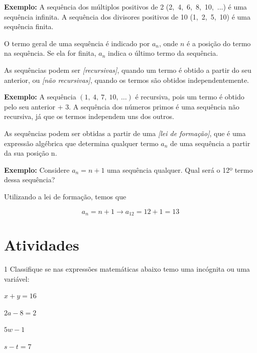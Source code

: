 \textbf{Exemplo:} A sequência dos múltiplos positivos de 2
(2,\ 4,\ 6,\ 8,\ 10,\ ...) é uma sequência infinita. A sequência dos
divisores positivos de 10 (1,\ 2,\ 5,\ 10) é uma sequência finita.

O termo geral de uma sequência é indicado por $a_{n}$, onde $n$  é
a posição do termo na sequência. Se ela for finita, $a_{n}$ indica o
último termo da sequência.

As sequências podem ser \emph{{[}recursivas{]}}, quando um termo é
obtido a partir do seu anterior, ou \emph{{[}não recursivas{]}}, quando
os termos são obtidos independentemente.

\textbf{Exemplo:} A sequência $(1,\ 4,\ 7,\ 10,\ \ldots{})$ é recursiva,
pois um termo é obtido pelo seu anterior + 3. A sequência dos números
primos é uma sequência não recursiva, já que os termos independem uns
dos outros.

As sequências podem ser obtidas a partir de uma \emph{{[}lei de
formação{]}}, que é uma expressão algébrica que determina qualquer termo
$a_{n}$  de uma sequência a partir da sua posição n.

\textbf{Exemplo:} Considere $a_{n} = n + 1$ uma sequência qualquer.
Qual será o 12º termo dessa sequência?

Utilizando a lei de formação, temos que

$$a_{n} = n + 1 \rightarrow a_{12} = 12 + 1 = 13$$

\section{Atividades}

\num{1} Classifique se nas expressões matemáticas abaixo temo uma incógnita
ou uma variável:

\begin{escolha}
\item $x + y = 16$  \\
\item $2a - 8 = 2$  \\
\item $5w - 1$  \\
\item $s - t = 7$ 
\end{escolha}

